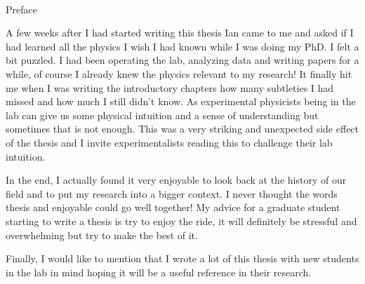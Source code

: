 
\renewcommand{\baselinestretch}{2}
\small\normalsize
\hbox{\ }
 
\vspace{-.65in}

\begin{center}
\large{Preface} 
\end{center} 

A few weeks after I had started writing this thesis Ian came to me and asked if I had learned all the physics I wish I had known while I was doing my PhD. I felt a bit puzzled. I had been operating the lab, analyzing data and writing papers for a while, of course I already knew the physics relevant to my research! It finally hit me when I was writing the introductory chapters how many subtleties I had missed and how much I still didn't know. As experimental physicists being in the lab can give us some physical intuition and a sense of understanding but sometimes that is not enough. This was a very striking and unexpected side effect of the thesis and I invite experimentalists reading this to challenge their lab intuition. 

In the end, I actually found it very enjoyable to look back at the history of our field and to put my research into a bigger context. I never thought the words thesis and  enjoyable could go well together! My advice for a graduate student starting to write a thesis is try to enjoy the ride, it will definitely be stressful and overwhelming but try to make the best of it. 

Finally, I would like to mention that I wrote a lot of this thesis with new students in the lab in mind hoping it will be a useful reference in their research.